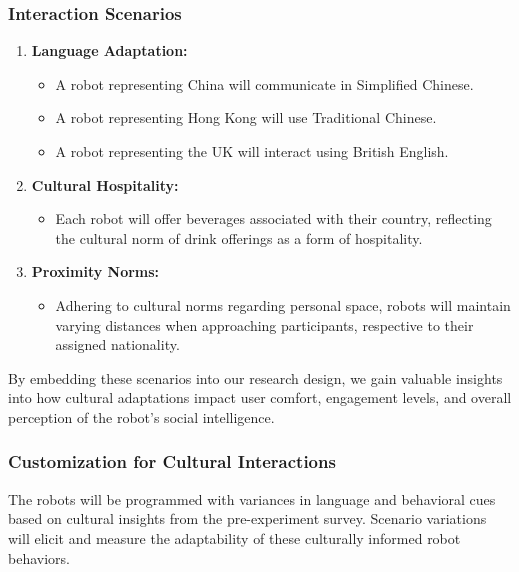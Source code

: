 \subsubsection{Interaction Scenarios}

\begin{enumerate}
    \item \textbf{Language Adaptation:}
    \begin{itemize}
        \item A robot representing China will communicate in Simplified Chinese.
        \item A robot representing Hong Kong will use Traditional Chinese.
        \item A robot representing the UK will interact using British English.
    \end{itemize}
    
    \item \textbf{Cultural Hospitality:}
    \begin{itemize}
        \item Each robot will offer beverages associated with their country, reflecting the cultural norm of drink offerings as a form of hospitality.
    \end{itemize}
    
    \item \textbf{Proximity Norms:}
    \begin{itemize}
        \item Adhering to cultural norms regarding personal space, robots will maintain varying distances when approaching participants, respective to their assigned nationality.
    \end{itemize}
\end{enumerate}

By embedding these scenarios into our research design, we gain valuable insights into how cultural adaptations impact user comfort, engagement levels, and overall perception of the robot’s social intelligence.

\subsubsection{Customization for Cultural Interactions}

The robots will be programmed with variances in language and behavioral cues based on cultural insights from the pre-experiment survey. Scenario variations will elicit and measure the adaptability of these culturally informed robot behaviors.


